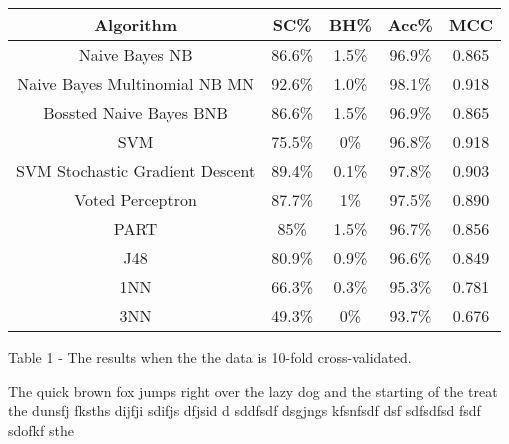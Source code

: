 \begin{center}
 \begin{tabular}{|c|c|c|c|c|} 
 \hline
 Algorithm & SC\% & BH\% & Acc\%  & MCC \\ [0.5ex] 
 \hline\hline
 Naive Bayes NB & 86.6\% & 1.5\% & 96.9\% & 0.865  \\ 
 \hline
 Naive Bayes Multinomial NB MN & 92.6\% & 1.0\% & 98.1\% & 0.918  \\ 
 \hline
 Bossted Naive Bayes BNB & 86.6\% & 1.5\% & 96.9\% & 0.865  \\ 
 \hline
 SVM & 75.5\% & 0\% & 96.8\% & 0.918  \\ 
 \hline
 SVM Stochastic Gradient Descent & 89.4\% & 0.1\% & 97.8\% & 0.903  \\ 
 \hline
 Voted Perceptron & 87.7\% & 1\% & 97.5\% & 0.890  \\ 
 \hline
 PART & 85\% & 1.5\% & 96.7\% & 0.856  \\ 
 \hline
 J48 & 80.9\% & 0.9\% & 96.6\% & 0.849  \\ 
 \hline
 1NN & 66.3\% & 0.3\% & 95.3\% & 0.781  \\ 
 \hline
 3NN & 49.3\% & 0\% & 93.7\% & 0.676 \\ [1ex] 
 \hline
 \end{tabular}
 
      \small
      \item Table 1 - The results when the the data is 10-fold cross-validated.
    
 
\end{center}

The quick brown fox jumps right over the lazy dog and the starting of the treat the dunsfj fksths dijfji sdifjs dfjsid d sddfsdf dsgjngs 
kfsnfsdf dsf sdfsdfsd fsdf sdofkf sthe 

 



